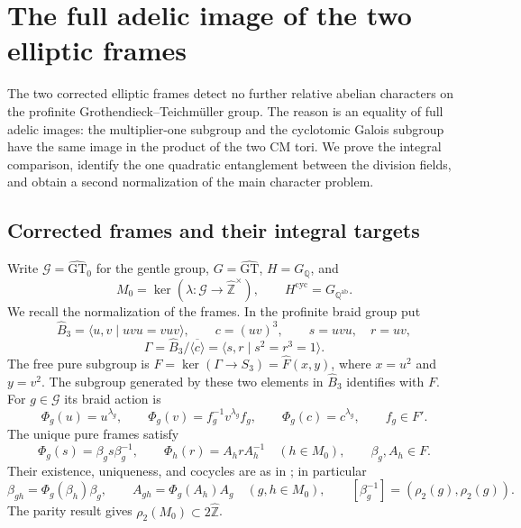 \section{The full adelic image of the two elliptic frames}
\label{sec:adelic-cm-frames}

The two corrected elliptic frames detect no further relative abelian
characters on the profinite Grothendieck--Teichm\"uller group.  The
reason is an equality of full adelic images: the multiplier-one
subgroup and the cyclotomic Galois subgroup have the same image in the
product of the two CM tori.  We prove the integral comparison, identify
the one quadratic entanglement between the division fields, and obtain
a second normalization of the main character problem.

\subsection{Corrected frames and their integral targets}

Write $\mathcal G=\widehat{\mathrm{GT}}_0$ for the gentle group,
$G=\widehat{\mathrm{GT}}$, $H=G_{\mathbb Q}$, and
\[
 M_0=\ker(\lambda:\mathcal G\longrightarrow
                       \widehat{\mathbb Z}^{\times}),
 \qquad H^{\mathrm{cyc}}=G_{\mathbb Q^{\mathrm{ab}}}.
\]
We recall the normalization of the frames.  In the profinite braid
group put
\[
 \widehat B_3=\langle u,v\mid uvu=vuv\rangle,\qquad
 c=(uv)^3,\qquad s=uvu,\quad r=uv,
\]
\[
 \Gamma=\widehat B_3/\overline{\langle c\rangle}
             =\langle s,r\mid s^2=r^3=1\rangle.
\]
The free pure subgroup is
$F=\ker(\Gamma\to S_3)=\widehat F(x,y)$, where
$x=u^2$ and $y=v^2$.  The subgroup generated by these two elements
in $\widehat B_3$ identifies with $F$.  For $g\in\mathcal G$ its
braid action is
\[
 \Phi_g(u)=u^{\lambda_g},\qquad
 \Phi_g(v)=f_g^{-1}v^{\lambda_g}f_g,\qquad
 \Phi_g(c)=c^{\lambda_g},\qquad f_g\in F'.
\]
The unique pure frames satisfy
\[
 \Phi_g(s)=\beta_gs\beta_g^{-1},\qquad
 \Phi_h(r)=A_hrA_h^{-1}\quad(h\in M_0),
 \qquad \beta_g,A_h\in F.
\]
Their existence, uniqueness, and cocycles are as in
\cite[Lemmas~5 and~7]{H17}; in particular
\begin{equation}
 \beta_{gh}=\Phi_g(\beta_h)\beta_g,\qquad
 A_{gh}=\Phi_g(A_h)A_g\quad(g,h\in M_0),\qquad
 [\beta_g^{-1}]=(\rho_2(g),\rho_2(g)).
 \label{eq:adelic-frame-cocycles}
\end{equation}
The parity result gives $\rho_2(M_0)\subset2\widehat{\mathbb Z}$.

